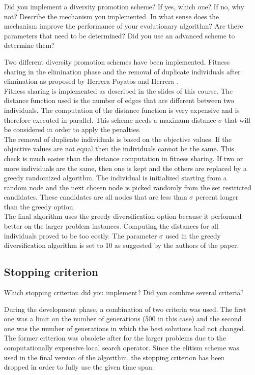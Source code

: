 \documentclass[a4paper,10pt]{article}
\newcommand{\ReplaceMe}[1]{{\color{blue}#1}}
\begin{document}
\ReplaceMe{Did you implement a diversity promotion scheme? If yes, which one? If no, why not? Describe the mechanism you implemented. In what sense does the mechanism improve the performance of your evolutionary algorithm? Are there parameters that need to be determined? Did you use an advanced scheme to determine them?}

Two different diversity promotion schemes have been implemented. Fitness sharing in the elimination phase and the removal of duplicate individuals after elimination as proposed by Herrera-Poyatos and Herrera \cite{herrera}.\\
Fitness sharing is implemented as described in the slides of this course. The distance function used is the number of edges that are different between two individuals. The computation of the distance function is very expensive and is therefore executed in parallel. This scheme needs a maximum distance $\sigma$ that will be considered in order to apply the penalties.\\
The removal of duplicate individuals is based on the objective values. If the objective values are not equal then the individuals cannot be the same. This check is much easier than the distance computation in fitness sharing. If two or more individuals are the same, then one is kept and the others are replaced by a greedy randomized algorithm. The individual is initialized starting from a random node and the next chosen node is picked randomly from the set restricted candidates. These candidates are all nodes that are less than $\sigma$ percent longer than the greedy option.\\
The final algorithm uses the greedy diversification option because it performed better on the larger problem instances. Computing the distances for all individuals proved to be too costly. The parameter $\sigma$ used in the greedy diversification algorithm is set to 10 as suggested by the authors of the paper.

\subsection{Stopping criterion}

\ReplaceMe{Which stopping criterion did you implement? Did you combine several criteria?}

During the development phase, a combination of two criteria was used. The first one was a limit on the number of generations (500 in this case) and the second one was the number of generations in which the best solutions had not changed. The former criterion was obsolete after for the larger problems due to the computationally expensive local search operator. Since the elitism scheme was used in the final version of the algorithm, the stopping criterion has been dropped in order to fully use the given time span.
\end{document}
